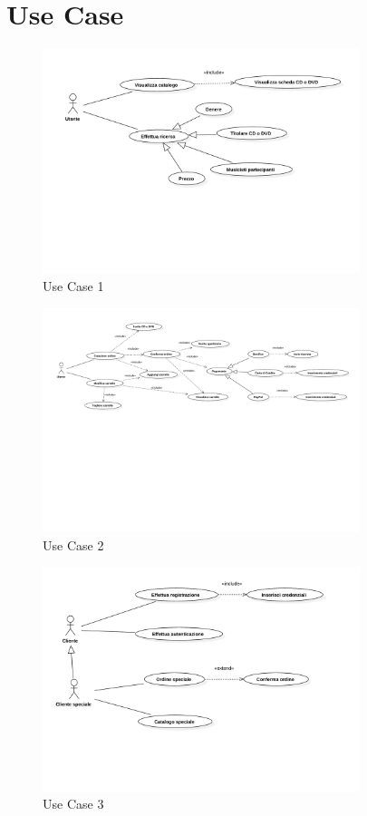 \documentclass[a4paper,titlepage]{book}
\begin{document}
\section{Use Case}
\begin{figure}[H]
\center
\includegraphics[width=350px]{img/Use1.pdf}
\caption{Use Case 1 \label{fig:use1}}
\end{figure}
\begin{figure}[H]
\center
\includegraphics[width=350px]{img/Use2.pdf}
\caption{Use Case 2 \label{fig:use2}}
\end{figure}
\begin{figure}[H]
\center
\includegraphics[width=350px]{img/Use3.pdf}
\caption{Use Case 3 \label{fig:use3}}
\end{figure}
\end{document}
